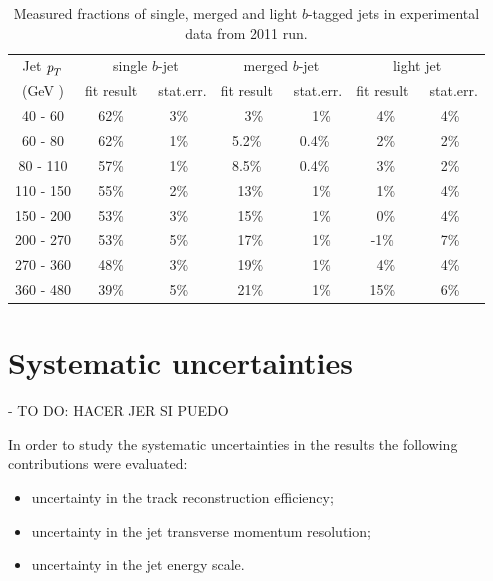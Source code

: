 \begin{table}[!hbt] %
\renewcommand{\arraystretch}{1.2}
\centering
\begin{tabular}{ | c || c | c || c | c || c | c ||}
  \hline
  Jet ${\emph{p}_{T}}$ & \multicolumn{2}{c||}{single $b$-jet} & \multicolumn{2}{c||}{merged $b$-jet} & \multicolumn{2}{c||}{~light jet~}\\ \cline{2-7}
    (GeV ) & fit result & ~stat.err. & fit result & ~stat.err. & fit result & ~stat.err.\\ \hline
   40 - 60 &  62\% &  3\%  &  ~~3\%  &  ~~1\% &  ~4\%  &  4\%   \\ 
   60 - 80 &  62\% &  1\%  &  5.2\%  &  0.4\% &  ~2\%  &  2\%   \\ 
   80 - 110&  57\% &  1\%  &  8.5\%  &  0.4\% &  ~3\%  &  2\%   \\ 
  110 - 150&  55\% &  2\%  &  ~13\%  &  ~~1\% &  ~1\%  &  4\%   \\ 
  150 - 200&  53\% &  3\%  &  ~15\%  &  ~~1\% &  ~0\%  &  4\%   \\ 
  200 - 270&  53\% &  5\%  &  ~17\%  &  ~~1\% &  -1\%  &  7\%   \\ 
  270 - 360&  48\% &  3\%  &  ~19\%  &  ~~1\% &  ~4\%  &  4\%   \\ 
  360 - 480&  39\% &  5\%  &  ~21\%  &  ~~1\% &  15\%  &  6\%   \\ \hline
\end{tabular}
\caption{Measured fractions of single, merged and light $b$-tagged jets in experimental data from 2011 run.}
\label{tb:fitfractions}
\end{table}







\section{Systematic uncertainties}\label{sec:FractionSystematics}

- TO DO: HACER JER SI PUEDO


In order to study the systematic uncertainties in the results the following contributions were evaluated:

\begin{itemize}\addtolength{\itemsep}{-0.4\baselineskip}
\item
uncertainty in the track reconstruction efficiency;
\item
uncertainty in the jet transverse momentum resolution;
\item
uncertainty in the jet energy scale.
\end{itemize}



